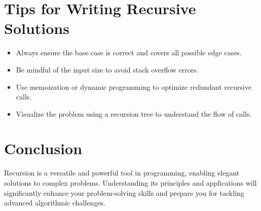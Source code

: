 \section*{Tips for Writing Recursive Solutions}
\begin{itemize}
    \item Always ensure the base case is correct and covers all possible edge cases.
    \item Be mindful of the input size to avoid stack overflow errors.
    \item Use memoization or dynamic programming to optimize redundant recursive calls.
    \item Visualize the problem using a recursion tree to understand the flow of calls.
\end{itemize}

\section*{Conclusion}
Recursion is a versatile and powerful tool in programming, enabling elegant solutions to complex problems. Understanding its principles and applications will significantly enhance your problem-solving skills and prepare you for tackling advanced algorithmic challenges.